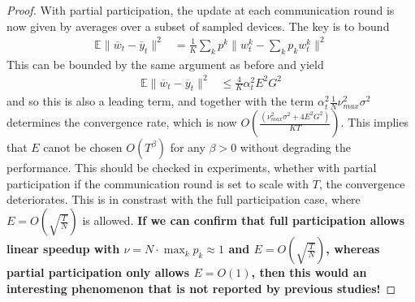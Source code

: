 \begin{proof}
	With partial participation, the update at each communication round
	is now given by averages over a subset of sampled devices. The key
	is to bound 
	\begin{align*}
	\mathbb{E}\|\overline{w}_{t}-\overline{y}_{t}\|^{2} & =\frac{1}{K}\sum_{k}p^{k}\|w_{t}^{k}-\sum_{k}p_{k}w_{t}^{k}\|^{2}
	\end{align*}
	This can be bounded by the same argument as before and yield 
	\begin{align*}
	\mathbb{E}\|\overline{w}_{t}-\overline{y}_{t}\|^{2} & \leq\frac{4}{K}\alpha_{t}^{2}E^{2}G^{2}
	\end{align*}
	and so this is also a leading term, and together with the term $\alpha_{t}^{2}\frac{1}{N}\nu_{max}^{2}\sigma^{2}$
	determines the convergence rate, which is now $O(\frac{(\nu_{max}^{2}\sigma^{2}+4E^{2}G^{2})}{KT})$.
	This implies that $E$ canot be chosen $O(T^{\beta})$ for any $\beta>0$
	without degrading the performance. This should be checked in experiments,
	whether with partial participation if the communication round is set
	to scale with $T$, the convergence deteriorates. This is in constrast
	with the full participation case, where $E=O(\sqrt{\frac{T}{N}})$
	is allowed. \textbf{If we can confirm that full participation allows
		linear speedup with $\nu=N\cdot\max_{k}p_{k}\approx1$ and $E=O(\sqrt{\frac{T}{N}})$,
		whereas partial participation only allows $E=O(1)$, then this would
		an interesting phenomenon that is not reported by previous studies!}
\end{proof}